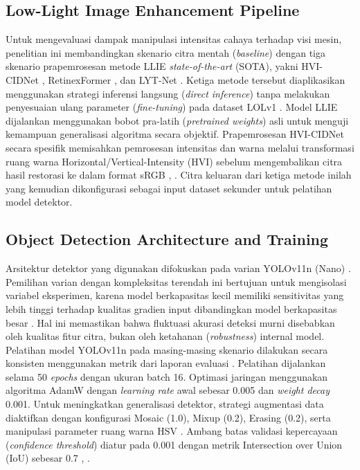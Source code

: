 ﻿\documentclass[conference]{IEEEtran}
\begin{document}
\subsection{Low-Light Image Enhancement Pipeline} Untuk mengevaluasi dampak manipulasi intensitas cahaya terhadap visi mesin, penelitian ini membandingkan skenario citra mentah (\textit{baseline}) dengan tiga skenario prapemrosesan metode LLIE \textit{state-of-the-art} (SOTA), yakni HVI-CIDNet \cite{yan2025hvi}, RetinexFormer \cite{cai2023retinexformer}, dan LYT-Net \cite{brateanu2025lytnet}.
Ketiga metode tersebut diaplikasikan menggunakan strategi inferensi langsung (\textit{direct inference}) tanpa melakukan penyesuaian ulang parameter (\textit{fine-tuning}) pada dataset LOLv1 \cite{proposal2026sempro}. Model LLIE dijalankan menggunakan bobot pra-latih (\textit{pretrained weights}) asli untuk menguji kemampuan generalisasi algoritma secara objektif. Prapemrosesan HVI-CIDNet secara spesifik memisahkan pemrosesan intensitas dan warna melalui transformasi ruang warna Horizontal/Vertical-Intensity (HVI) sebelum mengembalikan citra hasil restorasi ke dalam format sRGB \cite{yan2025hvi}, \cite{proposal2026sempro}. Citra keluaran dari ketiga metode inilah yang kemudian dikonfigurasi sebagai input dataset sekunder untuk pelatihan model detektor.

\subsection{Object Detection Architecture and Training} Arsitektur detektor yang digunakan difokuskan pada varian YOLOv11n (Nano) \cite{khanam2024yolov11}. Pemilihan varian dengan kompleksitas terendah ini bertujuan untuk mengisolasi variabel eksperimen, karena model berkapasitas kecil memiliki sensitivitas yang lebih tinggi terhadap kualitas gradien input dibandingkan model berkapasitas besar \cite{proposal2026sempro}. Hal ini memastikan bahwa fluktuasi akurasi deteksi murni disebabkan oleh kualitas fitur citra, bukan oleh ketahanan (\textit{robustness}) internal model.
Pelatihan model YOLOv11n pada masing-masing skenario dilakukan secara konsisten menggunakan metrik dari laporan evaluasi \cite{report2026internal}. Pelatihan dijalankan selama 50 \textit{epochs} dengan ukuran batch 16. Optimasi jaringan menggunakan algoritma AdamW dengan \textit{learning rate} awal sebesar 0.005 dan \textit{weight decay} 0.001. Untuk meningkatkan generalisasi detektor, strategi augmentasi data diaktifkan dengan konfigurasi Mosaic (1.0), Mixup (0.2), Erasing (0.2), serta manipulasi parameter ruang warna HSV \cite{report2026internal}. Ambang batas validasi kepercayaan (\textit{confidence threshold}) diatur pada 0.001 dengan metrik Intersection over Union (IoU) sebesar 0.7 \cite{report2026internal}, \cite{metrics2026formulas}.
\end{document}
